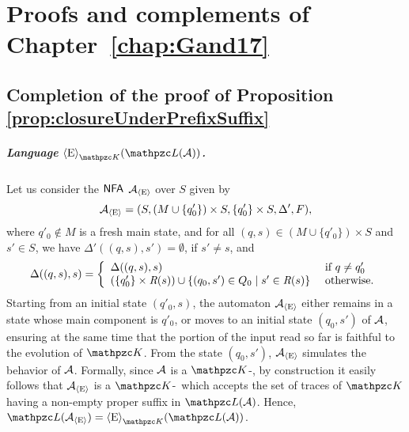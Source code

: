 \chapter{Proofs and complements of Chapter~\ref{chap:Gand17}}
\minitoc\mtcskip


\section{Completion of the proof of Proposition \ref{prop:closureUnderPrefixSuffix}}\label{sec:prop:closureUnderPrefixSuffix}
\paragraph*{Language $\hsE_{\Ku}(\Lang(\Au))$.} Let us consider the $\text{\sffamily NFA}$ $\mathcal{A}_{\operatorname{\langle E\rangle}}$ over $S$ given by
\[\mathcal{A}_{\operatorname{\langle E\rangle}}=(S,(M\cup \{q'_0\})\times S ,\{q'_0\}\times S,\Delta',F),\]
where $q'_0\notin M$ is a fresh main state, and for all
$(q,s)\in (M\cup \{q'_0\})\times S$ and $s'\in S$, we have $\Delta'((q,s),s')=\emptyset$, if $s'\neq s$, and 
%
\[
\Delta((q,s),s)=  \left\{
    \begin{array}{ll}
    \Delta((q,s),s)
      &    \text{ if }  q\neq q'_0
      \\
(\{q'_0\}\times \textit{R}(s))\cup \{(q_0,s')\in Q_0\mid s'\in \textit{R}(s)\}
 &    \text{ otherwise.}
    \end{array}
  \right.
\]
%
Starting from an initial state $(q'_0,s)$, the automaton $\mathcal{A}_{\operatorname{\langle E\rangle}}$ either remains in a state whose   main component is $q'_0$, or moves to an initial state $(q_0,s')$ of $\mathcal{A}$, ensuring at the same time that the portion of the input read so far is faithful to the evolution of  $\Ku$. From the state $(q_0,s')$,
 $\mathcal{A}_{\operatorname{\langle E\rangle}}$ simulates the behavior of $\mathcal{A}$.  Formally, since $\mathcal{A}$ is a $\Ku$-\NFA,  by construction it easily follows that $\mathcal{A}_{\operatorname{\langle E\rangle}}$ is a
   $\Ku$-\NFA\ which accepts the set of traces of $\Ku$ having a non-empty proper suffix in $\Lang(\Au)$. Hence,
   $\Lang(\Au_{\hsE})=\hsE_{\Ku}(\Lang(\Au))$.
   
